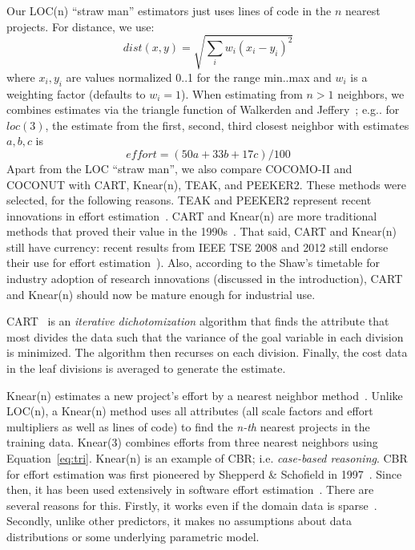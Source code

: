 \documentclass{sig-alternate}
\begin{document}
Our LOC(n) ``straw man'' 
estimators just uses  lines of code
in the $n$ nearest projects. For distance,
we use:
\begin{equation}\label{eq:dist}
\mathit{dist}(x,y) = \sqrt{\sum_i w_i (x_i-y_i)^2}
\end{equation} 
where $x_i,y_i$ 
are values normalized 0..1 for the range min..max
and $w_i$ is a weighting factor (defaults to $w_i=1$).
When  estimating from $n>1$ neighbors,
we combines estimates via the triangle 
function of  Walkerden
and Jeffery~\cite{Walkerden1999}; 
e.g.. for $loc(3)$, the  estimate
from the first, second, third closest neighbor with estimates
$a,b,c$ is 
\begin{equation}\label{eq:tri}
\mathit{effort} = (50a + 33b + 17c)/100
\end{equation}
Apart from the LOC ``straw man'',
we also compare COCOMO-II and COCONUT with CART,
Knear(n), TEAK, and PEEKER2. 
These  methods were  selected, for the following reasons.
TEAK  and PEEKER2   represent   recent innovations in effort
estimation~\cite{koc11b,papa13}.  
CART and Knear(n) are more traditional methods  that proved their value  in the 1990s~\cite{shepperd97,Walkerden1999}. That said, CART and Knear(n)
still have currency: 
recent results from IEEE TSE 2008 and 2012 still endorse their  use for effort estimation~\cite{dejaeger12,koc11a,keung2008b}).
Also, according to the Shaw's timetable for industry adoption of research innovations
(discussed in the introduction),  CART and Knear(n) should now be mature enough for industrial use.


CART~\cite{breiman84} is an {\em iterative dichotomization} algorithm
that finds the attribute that most divides the data such that
the variance of the goal variable in each division is minimized.
The algorithm then recurses on each division. 
Finally, the cost data in the leaf divisions
is averaged to generate the estimate. 


Knear(n) estimates a new project's effort
by a nearest neighbor  method~\cite{shepperd97}. Unlike LOC(n),
a Knear(n) method uses all attributes
(all scale factors and effort multipliers as well as lines of code)
to find the {\em n-th} nearest projects in the training data. 
Knear(3) combines efforts from three nearest neighbors using
Equation~\ref{eq:tri}.
Knear(n) is an example of CBR; i.e.  {\em case-based reasoning}.
CBR for effort estimation was 
first pioneered by Shepperd \& Schofield
in 1997~\cite{shepperd97}.
  Since then, it 
has been used extensively in software effort
estimation~\cite{Auer2006,Walkerden1999,%
  Kirsopp2002,shepperd97,kadoda00,Li2008,Li2006,Li2007,Li2009a,
  keung2008a,keung2008b,keung2008c}.  
There are several reasons  for this. Firstly, 
it works even if the domain data is sparse~\cite{Myrtveit}.
Secondly, 
unlike other predictors, it makes no assumptions about data
distributions or some  underlying parametric model. 
\end{document}
